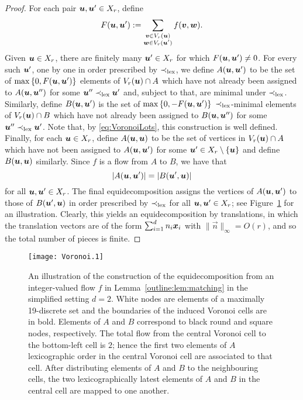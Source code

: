 \documentclass[12pt,a4paper]{amsart}
\numberwithin{equation}{section}
\theoremstyle{definition}
\begin{document}
\begin{proof}
For each pair $\boldsymbol{u},\boldsymbol{u}'\in X_r$, define 
\[F(\boldsymbol{u},\boldsymbol{u}'):=\sum_{\substack{\boldsymbol{v}\in V_r(\boldsymbol{u})\\ \boldsymbol{w}\in V_r(\boldsymbol{u}')}} f(\boldsymbol{v},\boldsymbol{w}).\]
Given $\boldsymbol{u}\in X_r$, there are finitely many $\boldsymbol{u}'\in X_r$ for which $F(\boldsymbol{u},\boldsymbol{u}')\neq 0$. For every such $\boldsymbol{u}'$, one by one in order prescribed by $\prec_{\operatorname{lex}}$, we define $A(\boldsymbol{u},\boldsymbol{u}')$ to be the set of $\max\left\{0,F(\boldsymbol{u},\boldsymbol{u}')\right\}$  elements of $V_r(\boldsymbol{u})\cap A$ which have not already been assigned to $A(\boldsymbol{u},\boldsymbol{u}'')$ for some $\boldsymbol{u}''\prec_{\operatorname{lex}} \boldsymbol{u}'$ and, subject to that, are minimal under $\prec_{\operatorname{lex}}$. Similarly, define $B(\boldsymbol{u},\boldsymbol{u}')$ is the set of $\max\left\{0,-F(\boldsymbol{u},\boldsymbol{u}')\right\}$ $\prec_{\operatorname{lex}}$-minimal elements of $V_r(\boldsymbol{u})\cap B$ which have not already been assigned to $B(\boldsymbol{u},\boldsymbol{u}'')$ for some $\boldsymbol{u}''\prec_{\operatorname{lex}} \boldsymbol{u}'$. Note that, by \eqref{eq:VoronoiLots}, this construction is well defined. Finally, for each $\boldsymbol{u}\in X_r$, define $A(\boldsymbol{u},\boldsymbol{u})$ to be the set of vertices in $V_r(\boldsymbol{u})\cap A$ which have not been assigned to $A(\boldsymbol{u},\boldsymbol{u}')$ for some $\boldsymbol{u}'\in X_r\setminus\{\boldsymbol{u}\}$ and define $B(\boldsymbol{u},\boldsymbol{u})$ similarly. Since $f$ is a flow from $A$ to $B$, we have that 
\[|A(\boldsymbol{u},\boldsymbol{u}')|=|B(\boldsymbol{u}',\boldsymbol{u})|\]
for all $\boldsymbol{u},\boldsymbol{u}'\in X_r$. The final equidecomposition assigns the vertices of $A(\boldsymbol{u},\boldsymbol{u}')$ to those of $B(\boldsymbol{u}',\boldsymbol{u})$ in order prescribed by $\prec_{\operatorname{lex}}$ for all $\boldsymbol{u},\boldsymbol{u}'\in X_r$; see Figure~\ref{fig:matching} for an illustration. Clearly, this yields an equidecomposition by translations, in which the translation vectors are of the form $\sum_{i=1}^dn_i\boldsymbol{x}_i$ with $\|\vec{n}\|_\infty=O(r)$, and so the total number of pieces is finite.  
\end{proof}


\begin{figure}[htbp]
\begin{center}
\texttt{[image: Voronoi.1]}
\end{center}
\caption{An illustration of the construction of the equidecomposition from an integer-valued flow $f$ in Lemma~\ref{outline:lem:matching} in the simplified setting $d=2$. White nodes are elements of a maximally 19-discrete set and the boundaries of the induced Voronoi cells are in bold. Elements of $A$ and $B$ correspond to black round and square nodes, respectively. The total flow from the central Voronoi cell to the bottom-left cell is $2$; hence the first two elements of $A$ lexicographic order in the central Voronoi cell are associated to that cell. After distributing elements of $A$ and $B$ to the neighbouring cells, the two lexicographically latest elements of $A$ and $B$ in the central cell are mapped to one another.}
\label{fig:matching}
\end{figure}
\end{document}
